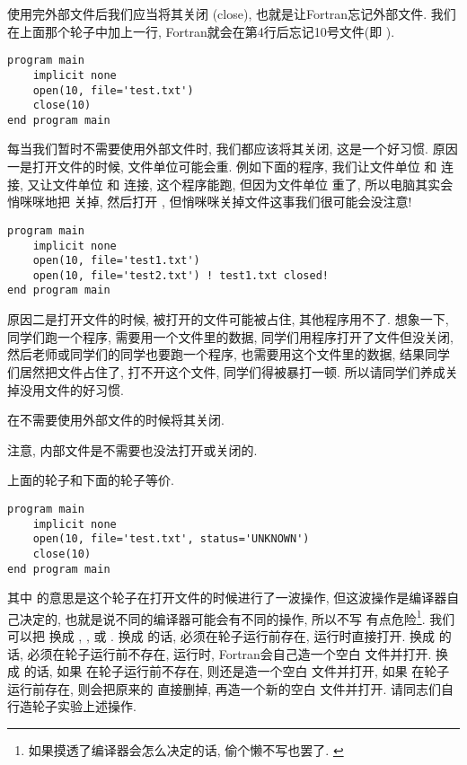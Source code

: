 使用完外部文件后我们应当将其关闭 (close), 也就是让Fortran忘记外部文件. 我们在上面那个轮子中加上一行, Fortran就会在第4行后忘记10号文件(即  ). 
\begin{lstlisting}
program main
    implicit none
    open(10, file='test.txt')
    close(10)
end program main
\end{lstlisting}

每当我们暂时不需要使用外部文件时, 我们都应该将其关闭, 这是一个好习惯. 原因一是打开文件的时候, 文件单位可能会重. 例如下面的程序, 我们让文件单位  和  连接, 又让文件单位  和  连接, 这个程序能跑, 但因为文件单位  重了, 所以电脑其实会悄咪咪地把  关掉, 然后打开 , 但悄咪咪关掉文件这事我们很可能会没注意!
\begin{lstlisting}
program main
    implicit none
    open(10, file='test1.txt')
    open(10, file='test2.txt') ! test1.txt closed!
end program main
\end{lstlisting}
原因二是打开文件的时候, 被打开的文件可能被占住, 其他程序用不了. 想象一下, 同学们跑一个程序, 需要用一个文件里的数据, 同学们用程序打开了文件但没关闭, 然后老师或同学们的同学也要跑一个程序, 也需要用这个文件里的数据, 结果同学们居然把文件占住了, 打不开这个文件, 同学们得被暴打一顿. 所以请同学们养成关掉没用文件的好习惯.
\begin{convention}
    在不需要使用外部文件的时候将其关闭. 
\end{convention}

注意, 内部文件是不需要也没法打开或关闭的. 

上面的轮子和下面的轮子等价. 
\begin{lstlisting}
program main
    implicit none
    open(10, file='test.txt', status='UNKNOWN')
    close(10)
end program main
\end{lstlisting}
其中   的意思是这个轮子在打开文件的时候进行了一波操作, 但这波操作是编译器自己决定的, 也就是说不同的编译器可能会有不同的操作, 所以不写  有点危险\footnote{如果摸透了编译器会怎么决定的话, 偷个懒不写也罢了. \label{no_add}}. 我们可以把  换成 , , 或 . 换成  的话,  必须在轮子运行前存在, 运行时直接打开. 换成  的话,  必须在轮子运行前不存在, 运行时, Fortran会自己造一个空白  文件并打开. 换成  的话, 如果  在轮子运行前不存在, 则还是造一个空白  文件并打开, 如果  在轮子运行前存在, 则会把原来的  直接删掉, 再造一个新的空白  文件并打开. 请同志们自行造轮子实验上述操作.

